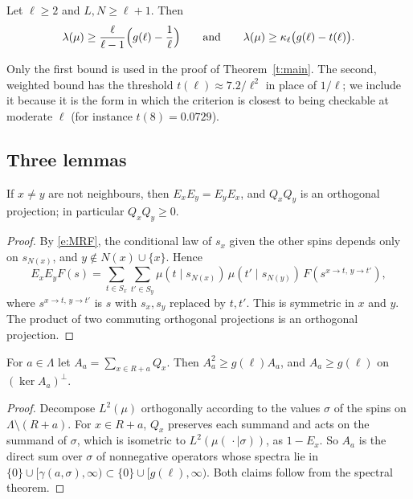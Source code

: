 \begin{theorem}\label{t:K}
Let $\ell \ge 2$ and $L, N \ge \ell + 1$. Then
\begin{equation}\label{e:K}
\lambda(\mu) \ge \frac{\ell}{\ell - 1} \Bigl( g(\ell) - \frac{1}{\ell} \Bigr) \qquad \text{and} \qquad \lambda(\mu) \ge \kappa_\ell \bigl( g(\ell) - t(\ell) \bigr) .
\end{equation}
\end{theorem}

Only the first bound is used in the proof of Theorem~\ref{t:main}. The second, weighted bound has the threshold $t(\ell) \approx 7.2 / \ell^2$ in place of $1/\ell$; we include it because it is the form in which the criterion is closest to being checkable at moderate $\ell$ (for instance $t(8) = 0.0729$).

\subsection{Three lemmas}

\begin{lemma}\label{l:commute}
If $x \neq y$ are not neighbours, then $E_x E_y = E_y E_x$, and $Q_x Q_y$ is an orthogonal projection; in particular $Q_x Q_y \ge 0$.
\end{lemma}

\begin{proof}
By \eqref{e:MRF}, the conditional law of $s_x$ given the other spins depends only on $s_{N(x)}$, and $y \notin N(x) \cup \{x\}$. Hence
\begin{equation*}
E_x E_y F(s) = \sum_{t \in S_x} \sum_{t' \in S_y} \mu(t \mid s_{N(x)}) \, \mu(t' \mid s_{N(y)}) \, F(s^{x \to t, \, y \to t'}),
\end{equation*}
where $s^{x \to t, \, y \to t'}$ is $s$ with $s_x, s_y$ replaced by $t, t'$. This is symmetric in $x$ and $y$. The product of two commuting orthogonal projections is an orthogonal projection.
\end{proof}

\begin{lemma}\label{l:fibre}
For $a \in \Lambda$ let $A_a = \sum_{x \in R + a} Q_x$. Then $A_a^2 \ge g(\ell) A_a$, and $A_a \ge g(\ell)$ on $(\ker A_a)^\perp$.
\end{lemma}

\begin{proof}
Decompose $L^2(\mu)$ orthogonally according to the values $\sigma$ of the spins on $\Lambda \setminus (R + a)$. For $x \in R + a$, $Q_x$ preserves each summand and acts on the summand of $\sigma$, which is isometric to $L^2(\mu(\, \cdot \mid \sigma))$, as $1 - E_x$. So $A_a$ is the direct sum over $\sigma$ of nonnegative operators whose spectra lie in $\{0\} \cup [\gamma(a, \sigma), \infty) \subset \{0\} \cup [g(\ell), \infty)$. Both claims follow from the spectral theorem.
\end{proof}

